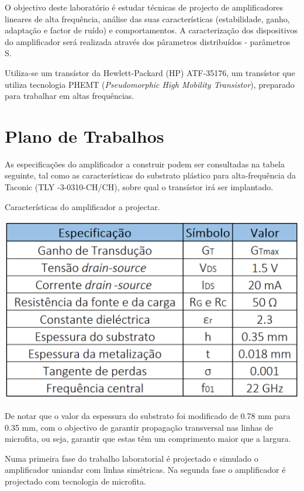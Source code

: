 \documentclass[11pt]{article}
\numberwithin{equation}{section}
\begin{document}
O objectivo deste laboratório é estudar técnicas de projecto de amplificadores lineares de alta frequência, análise das suas características (estabilidade, ganho, adaptação e factor de ruído) e comportamentos. A caracterização dos dispositivos do amplificador será realizada através dos pârametros distribuídos - parâmetros S.

Utiliza-se um transístor da Hewlett-Packard (HP) ATF-35176, um transístor que utiliza tecnologia PHEMT (\textit{Pseudomorphic High Mobility Transistor}), preparado para trabalhar em altas frequências.

\section{Plano de Trabalhos}
\label{sec:Pla_Trab}

As especificações do amplificador a construir podem ser consultadas na tabela seguinte, tal como as características do substrato plástico para alta-frequência da Taconic (TLY -3-0310-CH/CH), sobre qual o transístor irá ser implantado. 

\begin{table}[H]
	\centering
	\caption{Características do amplificador a projectar.}
	\vspace{-1.5mm}
	\includegraphics[keepaspectratio=true, scale=0.40]{teoricas/table1}
	\label{tab:car}
\end{table}

De notar que o valor da espessura do substrato foi modificado de 0.78 mm para 0.35 mm, com o objectivo de garantir propagação transversal nas linhas de microfita, ou seja, garantir que estas têm um comprimento maior que a largura. 

Numa primeira fase do trabalho laboratorial é projectado e simulado o amplificador uniandar com linhas simétricas. Na segunda fase o amplificador é projectado com tecnologia de microfita.
\end{document}
